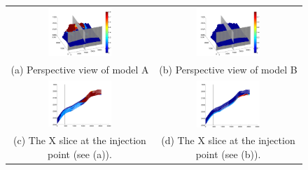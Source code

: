 \begin{figure}
\begin{tabular}{cc}
\includegraphics[width=0.45\textwidth]{./figurer/C02222_CO2atEOS_pers}&
\includegraphics[width=0.45\textwidth]{./figurer/C03211_CO2atEOS_pers}
\\(a) Perspective view of model A&(b) Perspective view of model B\\
\includegraphics[width=0.45\textwidth]{./figurer/C02222_CO2atEOS_slcx}&
\includegraphics[width=0.45\textwidth]{./figurer/C03211_CO2atEOS_slcx}
\\(c) The X slice at the injection point (see (a)).&
(d) The X slice at the injection point (see (b)).\\

\end{tabular}
\end{figure}
